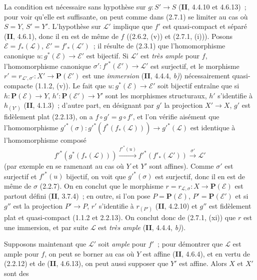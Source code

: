 La condition est nécessaire sans hypothèse sur $g:S'\to S$ (\textbf{II}, 4.4.10 et
4.6.13)~; pour voir qu'elle est suffisante, on peut comme dans (2.7.1) se
limiter au cas où $S=Y$, $S'=Y'$. L'hypothèse sur $\mathcal L'$ implique que
$f'$ est quasi-compact et séparé (\textbf{II}, 4.6.1), donc il en est de même de $f$
((2.6.2, (v)) et (2.7.1, (i))). Posons
$\mathcal E=f_*(\mathcal L)$, $\mathcal E'=f'_*(\mathcal L')$~; il résulte
de (2.3.1) que l'homomorphisme canonique
$u:g^*(\mathcal E)\to\mathcal E'$ est bijectif. Si $\mathcal L'$ est \emph{très
ample} pour $f$, l'homomorphisme canonique
$\sigma':f'^*(\mathcal E')\to\mathcal L'$ est surjectif, et le morphisme
$r'=r_{\mathcal L',\sigma'}:X'\to\mathbf P(\mathcal E')$
est une \emph{immersion} (\textbf{II}, 4.4.4, \emph{b)}) nécessairement quasi-compacte (1.1.2,
(v)). Le fait que $u:g^*(\mathcal E)\to\mathcal E'$ soit bijectif entraîne
que si $h:\mathbf P(\mathcal E)\to Y$, $h':\mathbf P(\mathcal E')\to Y'$
sont les morphismes structuraux, $h'$ s'identifie à $h_{(Y')}$ (\textbf{II}, 4.1.3)~;
d'autre part, en désignant par $g'$ la projection $X'\to X$, $g'$ est
fidèlement plat (2.2.13), on a $f\circ g'=g\circ f'$, et l'on vérifie
aisément que l'homomorphisme
$g'^*(\sigma):g'^*(f^*(f_*(\mathcal L)))\to g'^*(\mathcal L)$
est identique à l'homomorphisme composé
\[
f'^*(g^*(f_*(\mathcal L)))\xrightarrow{f'^*(u)}
f'^*(f'_*(\mathcal L'))\xrightarrow{\sigma'}\mathcal L'
\]
(par exemple en se ramenant au cas où $Y$ et $Y'$ sont affines). Comme
$\sigma'$ est surjectif et $f'^*(u)$ bijectif, on voit que
$g'^*(\sigma)$ est surjectif, donc il en est de même de $\sigma$ (2.2.7).
On en conclut que le morphisme
$r=r_{\mathcal L,\sigma}:X\to\mathbf P(\mathcal E)$ est partout défini
(\textbf{II}, 3.7.4)~; en outre, si l'on pose $P=\mathbf P(\mathcal E)$,
$P'=\mathbf P(\mathcal E')$ et si $g''$ est la projection $P'\to P$, $r'$
s'identifie à $r_{(P')}$ (\textbf{II}, 4.2.10) et $g''$ est fidèlement plat et
quasi-compact (1.1.2 et 2.2.13). On conclut donc de (2.7.1, (xi)) que $r$ est
une immersion, et par suite $\mathcal L$ est \emph{très ample} (\textbf{II}, 4.4.4, \emph{b)}).

Supposons maintenant que $\mathcal L'$ soit \emph{ample} pour $f'$~; pour démontrer
que $\mathcal L$ est ample pour $f$, on peut se borner au cas où $Y$ est
affine (\textbf{II}, 4.6.4), et en vertu de (2.2.12) et de (\textbf{II}, 4.6.13), on peut aussi
supposer que $Y'$ est affine. Alors $X$ et $X'$ sont des

